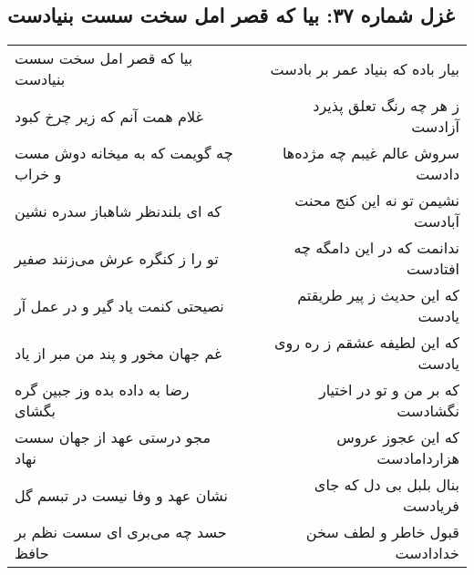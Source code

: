 \begin{center}
\section*{غزل شماره ۳۷: بیا که قصر امل سخت سست بنیادست}
\label{sec:sh037}
\begin{longtable}{l p{0.5cm} r}
بیا که قصر امل سخت سست بنیادست
&&
بیار باده که بنیاد عمر بر بادست
\\
غلام همت آنم که زیر چرخ کبود
&&
ز هر چه رنگ تعلق پذیرد آزادست
\\
چه گویمت که به میخانه دوش مست و خراب
&&
سروش عالم غیبم چه مژده‌ها دادست
\\
که ای بلندنظر شاهباز سدره نشین
&&
نشیمن تو نه این کنج محنت آبادست
\\
تو را ز کنگره عرش می‌زنند صفیر
&&
ندانمت که در این دامگه چه افتادست
\\
نصیحتی کنمت یاد گیر و در عمل آر
&&
که این حدیث ز پیر طریقتم یادست
\\
غم جهان مخور و پند من مبر از یاد
&&
که این لطیفه عشقم ز ره روی یادست
\\
رضا به داده بده وز جبین گره بگشای
&&
که بر من و تو در اختیار نگشادست
\\
مجو درستی عهد از جهان سست نهاد
&&
که این عجوز عروس هزاردامادست
\\
نشان عهد و وفا نیست در تبسم گل
&&
بنال بلبل بی دل که جای فریادست
\\
حسد چه می‌بری ای سست نظم بر حافظ
&&
قبول خاطر و لطف سخن خدادادست
\\
\end{longtable}
\end{center}
